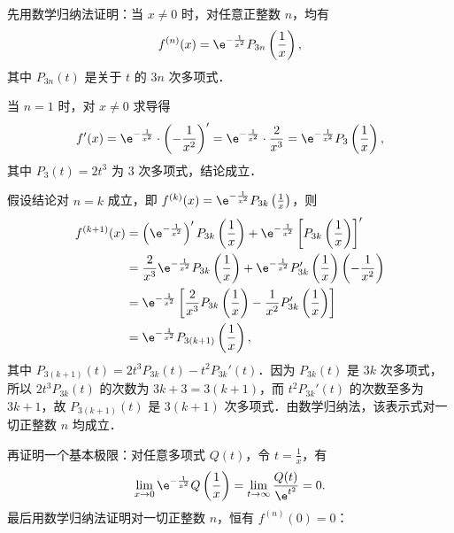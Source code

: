 \begin{myproof}
    先用数学归纳法证明：当 $x \neq 0$ 时，对任意正整数 $n$，均有
    \begin{equation}
        f^{(n)}(x) = \e^{-\frac{1}{x^2}} P_{3n}\left( \frac{1}{x} \right),
    \end{equation}
    其中 $P_{3n}(t)$ 是关于 $t$ 的 $3n$ 次多项式．

    当 $n = 1$ 时，对 $x \neq 0$ 求导得
    \begin{equation}
        f'(x) = \e^{-\frac{1}{x^2}} \cdot \left(-\frac{1}{x^2}\right)' = \e^{-\frac{1}{x^2}} \cdot \frac{2}{x^3} = \e^{-\frac{1}{x^2}} P_3\left(\frac{1}{x}\right),
    \end{equation}
    其中 $P_3(t) = 2t^3$ 为 $3$ 次多项式，结论成立．

    假设结论对 $n = k$ 成立，即 $f^{(k)}(x) = \e^{-\frac{1}{x^2}} P_{3k}\left(\frac{1}{x}\right)$，则
    \begin{equation}
        \begin{aligned}
            f^{(k+1)}(x) & = \left( \e^{-\frac{1}{x^2}} \right)' P_{3k}\left(\frac{1}{x}\right) + \e^{-\frac{1}{x^2}} \left[ P_{3k}\left(\frac{1}{x}\right) \right]'           \\
                         & = \frac{2}{x^3}\e^{-\frac{1}{x^2}} P_{3k}\left(\frac{1}{x}\right) + \e^{-\frac{1}{x^2}} P_{3k}'\left(\frac{1}{x}\right) \left(-\frac{1}{x^2}\right) \\
                         & = \e^{-\frac{1}{x^2}} \left[ \frac{2}{x^3} P_{3k}\left(\frac{1}{x}\right) - \frac{1}{x^2} P_{3k}'\left(\frac{1}{x}\right) \right]                   \\
                         & = \e^{-\frac{1}{x^2}} P_{3(k+1)}\left(\frac{1}{x}\right),
        \end{aligned}
    \end{equation}
    其中 $P_{3(k+1)}(t) = 2t^3 P_{3k}(t) - t^2 P_{3k}'(t)$．因为 $P_{3k}(t)$ 是 $3k$ 次多项式，所以 $2t^3 P_{3k}(t)$ 的次数为 $3k+3 = 3(k+1)$，而 $t^2 P_{3k}'(t)$ 的次数至多为 $3k+1$，故 $P_{3(k+1)}(t)$ 是 $3(k+1)$ 次多项式．由数学归纳法，该表示式对一切正整数 $n$ 均成立．

    再证明一个基本极限：对任意多项式 $Q(t)$，令 $t = \frac{1}{x}$，有
    \begin{equation}
        \lim_{x\to 0} \e^{-\frac{1}{x^2}} Q\left(\frac{1}{x}\right) = \lim_{t\to\infty} \frac{Q(t)}{\e^{t^2}} = 0.
    \end{equation}
    最后用数学归纳法证明对一切正整数 $n$，恒有 $f^{(n)}(0) = 0$：


\end{myproof}
